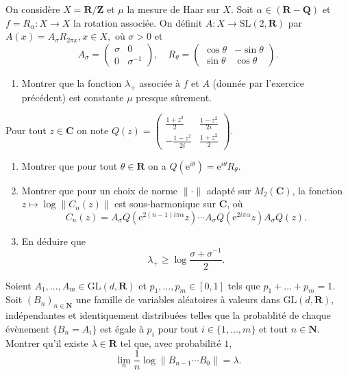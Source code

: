 \documentclass[a4paper,10pt,openany]{article}
\theoremstyle{plain}
\theoremstyle{definition}
\newcommand{\e}{\mathrm{e}}
\newcommand{\R}{\mathbf{R}}
\newcommand{\Q}{\mathbf{Q}}
\newcommand{\Z}{\mathbf{Z}}
\newcommand{\N}{\mathbf{N}}
\newcommand{\C}{\mathbf{C}}
\begin{document}
\noindent On consid\`ere $X = \R/\Z$ et $\mu$ la mesure de Haar sur $X$. Soit $\alpha \in (\R - \Q)$ et $f = R_\alpha : X \to X$ la rotation associ\'ee. On d\'efinit $A : X \to \mathrm{SL}(2, \R)$ par
$
A(x) = A_\sigma R_{2 \pi x},   x \in X,$
o\`u $\sigma > 0$ et 
$$
A_\sigma = \begin{pmatrix} \sigma & 0 \\ 0 & \sigma^{-1} \end{pmatrix}, \quad R_{\theta} = \begin{pmatrix} \cos \theta & -\sin \theta \\ \sin \theta & \cos \theta \end{pmatrix}.
$$
\begin{enumerate}
\item Montrer que la fonction $\lambda_+$ associ\'ee \`a $f$ et $A$ (donn\'ee par l'exercice pr\'ec\'edent) est constante $\mu$ presque s\^urement. 
\end{enumerate}
Pour tout $z \in \C$ on note
$
Q(z) = \begin{pmatrix} \displaystyle{\frac{1+ z^2}{2}} & \displaystyle{\frac{1-z^2}{2i}} \\ \displaystyle{-\frac{1 - z^2}{2i}} & \displaystyle{\frac{1 + z^2}{2}} \end{pmatrix}.
$
\begin{enumerate}[resume]
\item Montrer que pour tout $\theta \in \R$ on a 
$
Q\left(\e^{i\theta}\right) = \e^{i\theta} R_\theta.
$
\item Montrer que pour un choix de norme $\|\cdot\|$ adapt\'e sur $M_{2}(\C)$, la fonction $z \mapsto \log \|C_n(z)\|$ est sous-harmonique sur $\C$, o\`u
$$
C_n(z) = A_\sigma Q\left(\e^{2(n-1)i \pi\alpha}z\right) \cdots A_\sigma Q\left(\e^{2i \pi \alpha}z\right) A_\sigma Q(z).
$$
\item En d\'eduire que
$$
\lambda_+ \geq \log \frac{\sigma + \sigma^{-1}}{2}.
$$
\end{enumerate}
\vspace{0.6cm}


 \vspace{1.5mm}

\noindent Soient $A_1, \dots, A_m \in \mathrm{GL}(d, \R)$ et $p_1, \dots, p_m \in [0,1]$ tels que $p_1 + \dots + p_m = 1$. Soit $(B_n)_{n \in \N}$ une famille de variables al\'eatoires \`a valeurs dans $\mathrm{GL}(d, \R)$, ind\'ependantes et identiquement distribu\'ees telles que la probablit\'e de chaque \'ev\`enement
$
\{B_n = A_i\}
$
est \'egale \`a $p_i$ pour tout $i \in \{1, \dots, m\}$ et tout $n \in \N$.
Montrer qu'il existe $\lambda \in \R$ tel que, avec probabilit\'e $1$,
$$
\lim_n \frac{1}{n} \log \left\| B_{n-1} \cdots B_0 \right\| = \lambda.
$$
\vspace{0.6cm}
\end{document}
